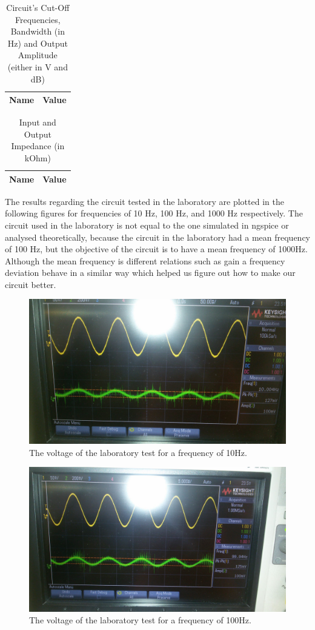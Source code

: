 \begin{table}[H]
\centering
\begin{tabular}{|l|l|}
\hline
{\bf Name} & {\bf Value} \\ \hline
    
\end{tabular}
\caption{Circuit's Cut-Off Frequencies, Bandwidth (in Hz) and Output Amplitude (either in V and dB)}
\end{table}

\begin{table}[H]
\centering
\begin{tabular}{|l|l|}
\hline
{\bf Name} & {\bf Value} \\ \hline
    
    
\end{tabular}
\caption{Input and Output Impedance (in kOhm)}
\end{table}

The results regarding the circuit tested in the laboratory are plotted in the following figures for frequencies of 10 Hz, 100 Hz, and 1000 Hz respectively.
The circuit used in the laboratory is not equal to the one simulated in ngspice or analysed theoretically, because the circuit in the laboratory had a mean frequency of 100 Hz, but the objective of the circuit is to have a mean frequency of 1000Hz. Although the mean frequency is different relations such as gain a frequency deviation behave in a similar way which helped us figure out how to make our circuit better.

\begin{figure}[H] 
\centering
\includegraphics[width=0.6\linewidth]{10Hz.jpeg}
\caption{The voltage of the laboratory test for a frequency of 10Hz.}
\label{Fig9: 10Hz}
\end{figure}

\begin{figure}[H] 
\centering
\includegraphics[width=0.6\linewidth]{100Hz.jpeg}
\caption{The voltage of the laboratory test for a frequency of 100Hz.}
\label{Fig10: 100Hz}
\end{figure}

